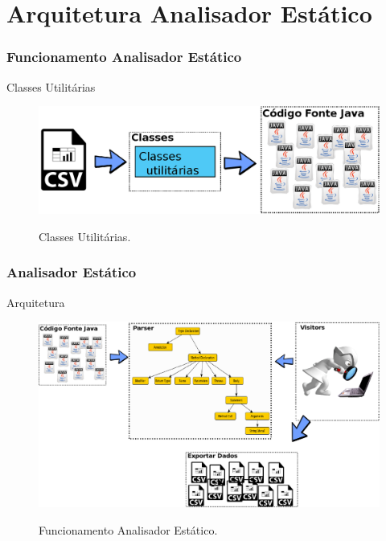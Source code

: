 \documentclass[]{beamer}
\begin{document}
		
	

\section{Arquitetura Analisador Estático}


\begin{frame}[label=metodologia, fragile]
	\frametitle{Funcionamento Analisador Estático}
	\begin{block}{Classes Utilitárias}
			\begin{figure}[h]
				\center
				\includegraphics[scale=0.50]{../TCC/Imagens/InputArquitetura}
				\label{fig:oportunidadesSwitchString}
				\caption{Classes Utilitárias.}
			\end{figure}
	\end{block}
\end{frame}


\begin{frame}[label=metodologia, fragile]
	\frametitle{Analisador Estático}
	\begin{block}{Arquitetura}
			\begin{figure}[h]
				\center
				\includegraphics[scale=0.30]{../TCC/Imagens/FuncionamentoVisitor}
				\label{fig:oportunidadesSwitchString}
				\caption{Funcionamento Analisador Estático.}
			\end{figure}
	\end{block}
\end{frame}
\end{document}
